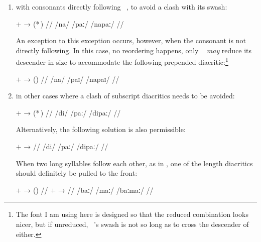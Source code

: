 \begin{enumerate}
\item with consonants directly following ~, to avoid a clash 
	with its swash:
	
	\ex[lingstyle=thex,numoffset=\leftmargin]
	\begingl
		\gla {} $+$  →  \quad
			(*\,) //
		\glb /na/ {} /paː/ {} /napaː/ {} {} //
	\endgl\xe
	
	An exception to this exception occurs, however, when the consonant is 
	not directly following. In this case, no reordering happens, only 
	~ \emph{may} reduce its descender in size to 
	accommodate the following prepended diacritic:\footnote{The font I am 
	using here is designed so that the reduced combination looks nicer, but 
	if unreduced, ~'s swash is not so long as to cross the 
	descender of  either.}
	
	\pex[lingstyle=thex,numoffset=\leftmargin]
	\begingl
		\gla {} $+$  →  \quad
			(\ques{}) //
		\glb /na/ {} /paɪ/ {} /napaɪ/ {} {} //
	\endgl\xe
	
\item in other cases where a clash of subscript diacritics needs to be avoided:

	\ex[lingstyle=thex,numoffset=\leftmargin]
	\begingl
		\gla {} $+$  →  \quad 
			(*\,) //
		\glb /di/ {} /paː/ {} /dipaː/ {} {} //
	\endgl\xe
	
	Alternatively, the following solution is also permissible:
	
	\ex[lingstyle=thex,numoffset=\leftmargin]%
	\begingl
		\gla {} $+$  → 
		 //
		\glb /di/ {} /paː/ {} /dipaː/ //
	\endgl\xe
	
	When two long syllables follow each other, as in 
	, one of the length diacritics should 
	definitely be pulled to the front:
	
	\ex[lingstyle=thex,everyglb=\upshape\Large,
	everyglc=\itshape,aboveglcskip=0.5em,numoffset=\leftmargin]
	\begingl
		\gla {}  $+$  →  \quad 
			(\ques{}) //
		  $+$  → 
			 //
		\glc {} /baː/ {} /maː/ {} /baːmaː/ //
	\endgl
	
	\xe

\end{enumerate}

